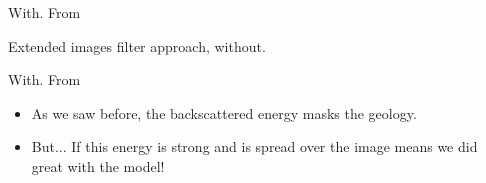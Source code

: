 \begin{frame}
With. From ~\cite{guitton:S19}
\end{frame}


\begin{frame}
Extended images filter approach, without.
\end{frame}

\begin{frame}
With. From ~\cite{kaelin:3125}
\end{frame}


\begin{frame}
	\begin{itemize}
		\item As we saw before, the backscattered energy masks the geology.
		\item But... If this energy is strong and is spread over the image means we did great with the model!
	\end{itemize}
\end{frame}





